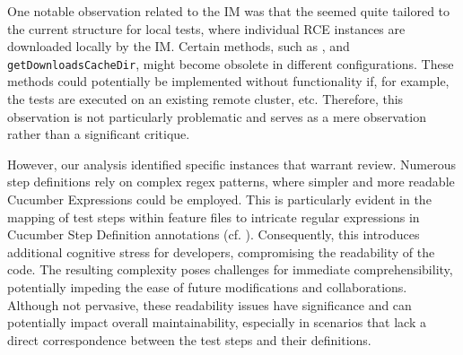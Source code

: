 One notable observation related to the \ac{IM} was that the \texttt{} seemed quite tailored to the current structure for local tests, where individual \ac{RCE} instances are downloaded locally by the \ac{IM}. Certain methods, such as \texttt{}, and \texttt{getDownloadsCacheDir}, might become obsolete in different configurations. These methods could potentially be implemented without functionality if, for example, the tests are executed on an existing remote cluster, etc. Therefore, this observation is not particularly problematic and serves as a mere observation rather than a significant critique.

However, our analysis identified specific instances that warrant review. Numerous step definitions rely on complex regex patterns, where simpler and more readable Cucumber Expressions could be employed. This is particularly evident in the mapping of test steps within feature files to intricate regular expressions in Cucumber Step Definition annotations (cf. ). Consequently, this introduces additional cognitive stress for developers, compromising the readability of the code. The resulting complexity poses challenges for immediate comprehensibility, potentially impeding the ease of future modifications and collaborations. Although not pervasive, these readability issues have significance and can potentially impact overall maintainability, especially in scenarios that lack a direct correspondence between the test steps and their definitions.